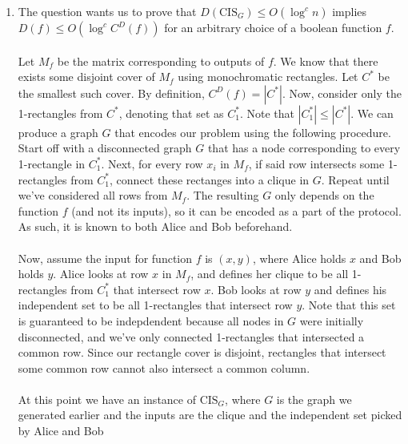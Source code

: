 \documentclass{article}
\begin{document}
\begin{enumerate}
\begin{enumerate}[label=(\alph*)]
            \item The question wants us to prove that $D(\textrm{CIS}_G) \leq
                O(\log^c n)$ implies $D(f) \leq O(\log^c C^D(f))$ for an
                arbitrary choice of a boolean function $f$.
                \\\\
                Let $M_f$ be the matrix corresponding to outputs of $f$. We
                know that there exists some disjoint cover of $M_f$ using
                monochromatic rectangles. Let $C^*$ be the smallest such cover.
                By definition, $C^D(f) = |C^*|$. Now, consider only the
                1-rectangles from $C^*$, denoting that set as $C^*_1$. Note
                that $|C^*_1| \leq |C^*|$. We can produce a graph $G$ that
                encodes our problem using the following procedure. Start off
                with a disconnected graph $G$ that has a node corresponding to 
                every 1-rectangle in $C^*_1$. Next, for every row $x_i$ in
                $M_f$, if said row intersects some 1-rectangles from $C^*_1$,
                connect these rectanges into a clique in $G$. Repeat until
                we've considered all rows from $M_f$. The resulting $G$ only
                depends on the function $f$ (and not its inputs), so it can be
                encoded as a part of the protocol. As such, it is known to both
                Alice and Bob beforehand.
                \\\\
                Now, assume the input for function $f$ is $(x, y)$, where Alice
                holds $x$ and Bob holds $y$. Alice looks at row $x$ in $M_f$,
                and defines her clique to be all 1-rectangles from $C^*_1$ that
                intersect row $x$. Bob looks at row $y$ and defines his
                independent set to be all 1-rectangles that intersect row $y$.
                Note that this set is guaranteed to be indepdendent because all
                nodes in $G$ were initially disconnected, and we've only
                connected 1-rectangles that intersected a common row. Since our
                rectangle cover is disjoint, rectangles that intersect some
                common row cannot also intersect a common column.
                \\\\
                At this point we have an instance of $\textrm{CIS}_G$, where
                $G$ is the graph we generated earlier and the inputs are the
                clique and the independent set picked by Alice and Bob

\end{enumerate}
\end{enumerate}
\end{document}
